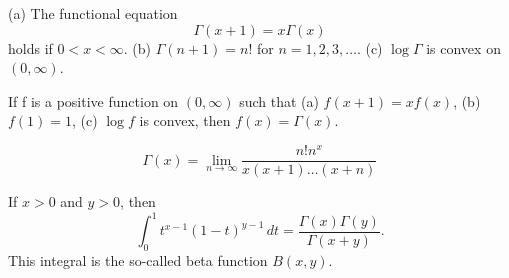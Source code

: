 \begin{theorem} %
  \label{thm:chap8:gamma_properties}
  (a) The functional equation
  \[ \Gamma(x+1) = x \Gamma(x) \]
  holds if $0 < x < \infty$.
  (b) $\Gamma(n+1) = n!$ for $n=1, 2, 3, \dots$.
  (c) $\log \Gamma$ is convex on $(0, \infty)$.
\end{theorem}




\begin{theorem} %
  \label{thm:chap8:bohr_mollerup}
  If f is a positive function on $(0, \infty)$ such that
  (a) $f(x+1) = x f(x)$,
  (b) $f(1) = 1$,
  (c) $\log f$ is convex,
  then $f(x) = \Gamma(x)$.
\end{theorem}

\begin{equation} \label{eq:chap8:gamma_limit_repr}
  \Gamma(x) = \lim_{n \to \infty} \frac{n! n^x}{x(x+1)\dots(x+n)}
\end{equation}

\begin{theorem} %
  \label{thm:chap8:beta_function}
  If $x>0$ and $y>0$, then
  \begin{equation} \label{eq:chap8:beta_integral}
    \int_0^1 t^{x-1} (1-t)^{y-1} \, dt = \frac{\Gamma(x)\Gamma(y)}{\Gamma(x+y)}.
  \end{equation}
  This integral is the so-called beta function $B(x, y)$.
\end{theorem}

